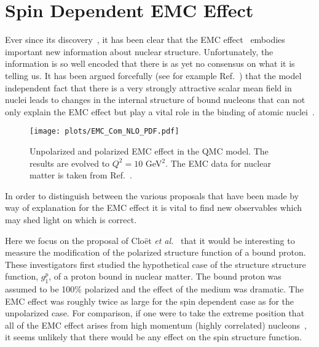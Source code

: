 \section{Spin Dependent EMC Effect}

Ever since its discovery~\cite{Aubert:1983xm,Bodek:1983ec}, it has been clear that the EMC 
effect~\cite{Geesaman:1995yd} embodies important new information about nuclear structure. Unfortunately, the information is so well encoded that there is as yet no consensus on what it is telling us. It has been argued forcefully (see for example Ref.~\cite{Thomas:2016bxx,Guichon:2018uew}) that the model independent fact that there is a very strongly attractive scalar mean field in nuclei leads to changes in the internal structure of bound nucleons that can not only explain the EMC effect but play a vital role in the binding of atomic nuclei~\cite{Stone:2017oqt,Stone:2016qmi}. 
%
    \begin{figure}[tbp]
        \centering\texttt{[image: plots/EMC\_Com\_NLO\_PDF.pdf]}
        \caption{Unpolarized and polarized EMC effect in the QMC model. The results are evolved to $Q^2=10$ GeV$^2$. The EMC data for nuclear matter is taken from Ref.~\cite{Sick:1992pw}.}
	\label{fig:EMC_Com}
    \end{figure}
%

In order to distinguish between the various proposals that have been made by way of explanation for the EMC effect it is vital to find new observables which may shed light on which is correct. %

Here we focus on the proposal of Clo\"et {\it et al.}~\cite{Cloet:2005rt,Cloet:2006bq} that it would be interesting to measure the modification of the polarized structure function of a bound proton. These investigators first studied the hypothetical case of the structure structure function, $g_1^p$, of a proton bound in nuclear matter.  The bound proton was assumed to be 100\% polarized and the effect of the medium was dramatic. The EMC effect was roughly twice as large for the spin dependent case as for the unpolarized case.  For comparison, if one were to take the extreme position that all of the EMC effect arises from high momentum (highly correlated) nucleons~\cite{Weinstein:2010rt}, it seems unlikely that there would be any effect on the spin structure function.

